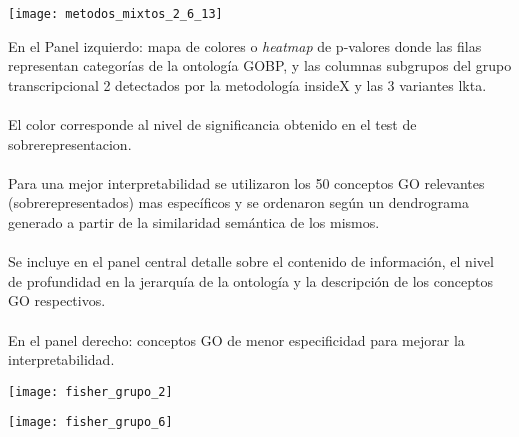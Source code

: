 \begin{center}
\texttt{[image: metodos\_mixtos\_2\_6\_13]}
\label{fig:metodos_mixtos_2_6_13}
\end{center}
En el Panel izquierdo: mapa de colores o \textit{heatmap} de p-valores donde las filas representan categorías de la ontología GOBP, y las columnas subgrupos del grupo transcripcional 2 detectados por la metodología insideX y las 3 variantes lkta.\\\\
El color corresponde al nivel de significancia obtenido en el test de sobrerepresentacion.\\\\ 
Para una mejor interpretabilidad se utilizaron los 50 conceptos GO relevantes (sobrerepresentados) mas específicos y se ordenaron según un dendrograma generado a partir de la similaridad semántica de los mismos.\\\\
Se incluye en el panel central detalle sobre el contenido de información, el nivel de profundidad en la jerarquía de la ontología y la descripción de los conceptos GO respectivos.\\\\
En el panel derecho: conceptos GO de menor especificidad para mejorar la interpretabilidad.

\begin{sidewaysfigure}[H]
 \centering
\texttt{[image: fisher\_grupo\_2]}
\label{fig:fisher_grupo_2}
\end{sidewaysfigure}

\begin{sidewaysfigure}[H]
 \centering
\texttt{[image: fisher\_grupo\_6]}
\label{fig:fisher_grupo_6}
\end{sidewaysfigure}

